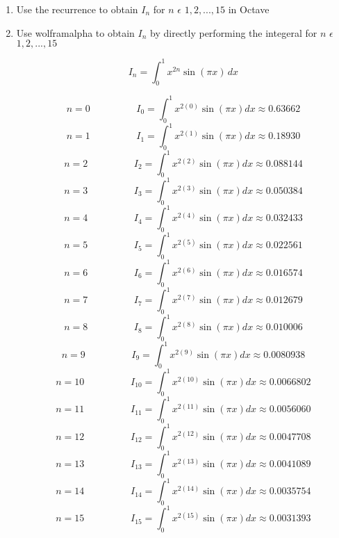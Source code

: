 \documentclass{article}
\begin{document}
\begin{enumerate}
\begin{enumerate}
        \vspace{2cm}

\item Use the recurrence to obtain $I_{n}$ for $n$ $\epsilon$ ${1,2,...,15}$ in Octave



\vspace{2cm}


\item Use wolframalpha to obtain $I_{n}$ by directly performing the integeral for $n$ 
$\epsilon$ ${1,2,...,15}$

$$I_{n} = \int_{0}^{1} x^{2n} \sin(\pi x) \, dx$$

        $$n = 0 \hspace{2cm} I_{0} = \int_{0}^{1} x^{2(0)} \sin(\pi x) dx \approx 0.63662$$
        $$n = 1 \hspace{2cm} I_{1} = \int_{0}^{1} x^{2(1)} \sin(\pi x) dx \approx 0.18930$$
        $$n = 2 \hspace{2cm} I_{2} = \int_{0}^{1} x^{2(2)} \sin(\pi x) dx \approx 0.088144$$
        $$n = 3 \hspace{2cm} I_{3} = \int_{0}^{1} x^{2(3)} \sin(\pi x) dx \approx 0.050384$$
        $$n = 4 \hspace{2cm} I_{4} = \int_{0}^{1} x^{2(4)} \sin(\pi x) dx \approx 0.032433$$
        $$n = 5 \hspace{2cm} I_{5} = \int_{0}^{1} x^{2(5)} \sin(\pi x) dx \approx 0.022561$$
        $$n = 6 \hspace{2cm} I_{6} = \int_{0}^{1} x^{2(6)} \sin(\pi x) dx \approx 0.016574$$
        $$n = 7 \hspace{2cm} I_{7} = \int_{0}^{1} x^{2(7)} \sin(\pi x) dx \approx 0.012679$$
        $$n = 8 \hspace{2cm} I_{8} = \int_{0}^{1} x^{2(8)} \sin(\pi x) dx \approx 0.010006$$
        $$n = 9 \hspace{2cm} I_{9} = \int_{0}^{1} x^{2(9)} \sin(\pi x) dx \approx 0.0080938$$
        $$n = 10 \hspace{2cm} I_{10} = \int_{0}^{1} x^{2(10)} \sin(\pi x) dx \approx 0.0066802$$
        $$n = 11 \hspace{2cm} I_{11} = \int_{0}^{1} x^{2(11)} \sin(\pi x) dx \approx 0.0056060$$
        $$n = 12 \hspace{2cm} I_{12} = \int_{0}^{1} x^{2(12)} \sin(\pi x) dx \approx 0.0047708$$
        $$n = 13 \hspace{2cm} I_{13} = \int_{0}^{1} x^{2(13)} \sin(\pi x) dx \approx 0.0041089$$
        $$n = 14 \hspace{2cm} I_{14} = \int_{0}^{1} x^{2(14)} \sin(\pi x) dx \approx 0.0035754$$
        $$n = 15 \hspace{2cm} I_{15} = \int_{0}^{1} x^{2(15)} \sin(\pi x) dx \approx 0.0031393$$


\end{enumerate}
\end{enumerate}
\end{document}
